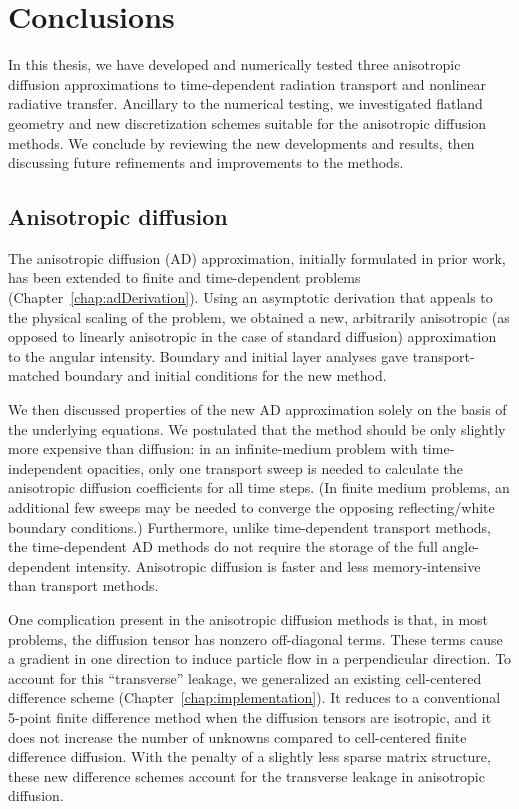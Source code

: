 
\chapter{Conclusions}\label{chap:conclusion}

In this thesis, we have developed and numerically tested three anisotropic
diffusion approximations to time-dependent radiation transport and
nonlinear radiative transfer. Ancillary to the numerical testing, we
investigated flatland geometry and new discretization schemes suitable for the
anisotropic diffusion methods. We conclude by reviewing the new developments and
results, then discussing future refinements and improvements to the methods.

\section{Anisotropic diffusion}

The anisotropic diffusion (AD) approximation, initially formulated in prior work, has been extended to finite and time-dependent problems
(Chapter~\ref{chap:adDerivation}). Using an asymptotic
derivation that appeals to the physical scaling of the problem, we
obtained a new, arbitrarily anisotropic (as opposed to linearly anisotropic in
the case of standard diffusion) approximation to the angular intensity.
Boundary and initial layer analyses gave transport-matched boundary and initial
conditions for the new method.

We then discussed properties of the new AD approximation solely on the basis of
the underlying equations. We postulated that the method should be only slightly
more expensive than diffusion: in an infinite-medium problem with
time-independent opacities, only one transport sweep is needed to calculate
the anisotropic diffusion coefficients for all time steps. (In finite medium
problems, an additional few sweeps may be needed to converge the opposing
reflecting/white boundary conditions.) Furthermore, unlike time-dependent
transport methods, the time-dependent AD methods do not require the storage of
the full angle-dependent intensity. Anisotropic diffusion is faster and less
memory-intensive than transport methods.

One complication present in the anisotropic diffusion methods is
that, in most problems, the diffusion tensor has nonzero off-diagonal terms.
These terms cause a gradient in one direction to induce particle flow in a
perpendicular direction. To account for this ``transverse'' leakage, we
generalized
an existing cell-centered difference scheme (Chapter~\ref{chap:implementation}).
It reduces to a conventional 5-point finite difference method when the diffusion
tensors are isotropic, and it does not increase the number of unknowns compared
to cell-centered finite difference diffusion. With the penalty of a slightly
less sparse matrix structure, these new difference schemes account for the
transverse leakage in anisotropic diffusion.


